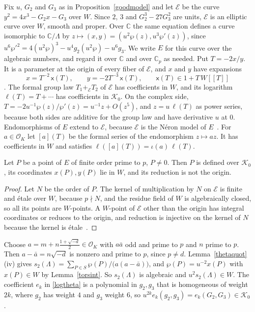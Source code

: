 Fix $u$, $G_2$ and $G_3$ as in Proposition~\ref{goodmodel} and let $\mathcal E$ be the curve $y^2=4x^3-G_2x-G_3$ over $W$. Since $2$, $3$ and $G_2^3-27G_3^2$ are units, $\mathcal E$ is an elliptic curve over $W$, smooth and proper. Over $\mathbb C$ the same equation defines a curve isomorphic to $\mathbb C/\Lambda$ by $z\mapsto(x,y)=(u^2\wp(z),u^3\wp'(z))$, since $u^6\wp'^2=4(u^2\wp)^3-u^4g_2(u^2\wp)-u^6g_3$. We write $E$ for this curve over the algebraic numbers, and regard it over $\mathbb C$ and over $\mathbb C_p$ as needed. Put $T=-2x/y$. It is a parameter at the origin of every fiber of $\mathcal E$, and $x$ and $y$ have expansions
\begin{equation}\label{xexp}
x=T^{-2}\,\mathsf x(T),\qquad y=-2T^{-3}\,\mathsf x(T),\qquad\mathsf x(T)\in1+T\,W[[T]]
\end{equation}
\cite[Chapter~IV, Section~1]{silvermanaec}. The formal group law $T_1+_{\mathcal E}T_2$ of $\mathcal E$ has coefficients in $W$, and its logarithm $\ell(T)=T+\cdots$ has coefficients in $\mathcal K_0$. On the complex side, $T=-2u^{-1}\wp(z)/\wp'(z)=u^{-1}z+O(z^5)$, and $z=u\,\ell(T)$ as power series, because both sides are additive for the group law and have derivative $u$ at $0$. Endomorphisms of $E$ extend to $\mathcal E$, because $\mathcal E$ is the N\'eron model of $E$~\cite[Section~1.2, Proposition~8]{blr}. For $a\in\mathcal O_K$ let $[a](T)$ be the formal series of the endomorphism $z\mapsto az$. It has coefficients in $W$ and satisfies $\ell([a](T))=\iota(a)\,\ell(T)$.

\begin{lemma}\label{torsint}
Let $P$ be a point of $E$ of finite order prime to $p$, $P\ne0$. Then $P$ is defined over $\mathcal K_0$, its coordinates $x(P),y(P)$ lie in $W$, and its reduction is not the origin.
\end{lemma}

\begin{proof}
Let $N$ be the order of $P$. The kernel of multiplication by $N$ on $\mathcal E$ is finite and \'etale over $W$, because $p\nmid N$, and the residue field of $W$ is algebraically closed, so all its points are $W$-points. A $W$-point of $\mathcal E$ other than the origin has integral coordinates or reduces to the origin, and reduction is injective on the kernel of $N$ because the kernel is \'etale~\cite[Chapter~VII, Proposition~3.1]{silvermanaec}.
\end{proof}

Choose $a=m+n\frac{1+\sqrt{-d}}2\in\mathcal O_K$ with $a\bar a$ odd and prime to $p$ and $n$ prime to $p$. Then $a-\bar a=n\sqrt{-d}$ is nonzero and prime to $p$, since $p\ne d$. Lemma~\ref{thetaquot}(iv) gives $s_2(\Lambda)=\sum_{P\in S}\wp(P)/\big(a(a-\bar a)\big)$, and $\wp(P)=u^{-2}x(P)$ with $x(P)\in W$ by Lemma~\ref{torsint}. So $s_2(\Lambda)$ is algebraic and $u^2s_2(\Lambda)\in W$. The coefficient $e_k$ in \eqref{logtheta} is a polynomial in $g_2,g_3$ that is homogeneous of weight $2k$, where $g_2$ has weight $4$ and $g_3$ weight $6$, so $u^{2k}e_k(g_2,g_3)=e_k(G_2,G_3)\in\mathcal K_0$.


